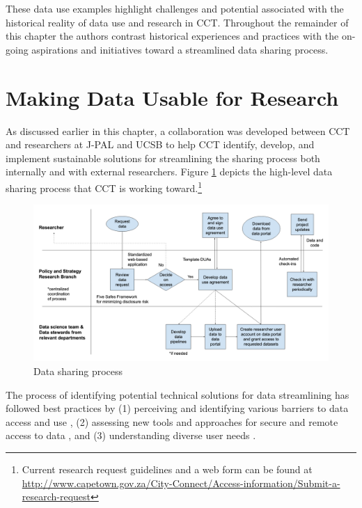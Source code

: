 These data use examples highlight challenges and potential associated with the historical reality of data use and research in CCT. Throughout the remainder of this chapter the authors contrast historical experiences and practices with the on-going aspirations and initiatives toward a streamlined data sharing process.

\hypertarget{making-data-usable-for-research-4}{%
\section{Making Data Usable for Research}\label{making-data-usable-for-research-4}}

As discussed earlier in this chapter, a collaboration was developed between CCT and researchers at J-PAL and UCSB to help CCT identify, develop, and implement sustainable solutions for streamlining the sharing process both internally and with external researchers. Figure \ref{fig:cctfigure1} depicts the high-level data sharing process that CCT is working toward.\footnote{Current research request guidelines and a web form can be found at \url{http://www.capetown.gov.za/City-Connect/Access-information/Submit-a-research-request}}

\begin{figure}
\includegraphics[width=1\linewidth]{./figures/cctfigure1} \caption{Data sharing process}\label{fig:cctfigure1}
\end{figure}

The process of identifying potential technical solutions for data streamlining has followed best practices by (1) perceiving and identifying various barriers to data access and use \citep{connelly2016, goerge2018, lane2008, petrila2018, abraham2019}, (2) assessing new tools and approaches for secure and remote access to data \citep{lane2008, culhane2018, foster2018}, and (3) understanding diverse user needs \citep{lane2018, abraham2019}.


